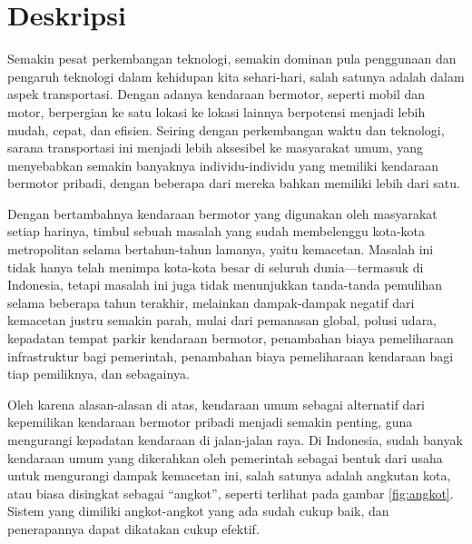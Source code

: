 \documentclass[a4paper,twoside]{article}
\begin{document}
\title{\@judultopik}
\author{\nama \textendash \@npm} 

\newcommand{\nama}{Alfred Aprianto Liaunardi}
\newcommand{\@npm}{6181801014}
\newcommand{\@judultopik}{Perkakas Command Line KIRI} %
\newcommand{\jumpemb}{1} %
\newcommand{\tanggal}{14/03/2022}


\maketitle


\section{Deskripsi}
Semakin pesat perkembangan teknologi, semakin dominan pula penggunaan dan pengaruh teknologi dalam kehidupan kita sehari-hari, salah satunya adalah dalam aspek transportasi. Dengan adanya kendaraan bermotor, seperti mobil dan motor, berpergian ke satu lokasi ke lokasi lainnya berpotensi menjadi lebih mudah, cepat, dan efisien. Seiring dengan perkembangan waktu dan teknologi, sarana transportasi ini menjadi lebih aksesibel ke masyarakat umum, yang menyebabkan semakin banyaknya individu-individu yang memiliki kendaraan bermotor pribadi, dengan beberapa dari mereka bahkan memiliki lebih dari satu.

Dengan bertambahnya kendaraan bermotor yang digunakan oleh masyarakat setiap harinya, timbul sebuah masalah yang sudah membelenggu kota-kota metropolitan selama bertahun-tahun lamanya, yaitu kemacetan. Masalah ini tidak hanya telah menimpa kota-kota besar di seluruh dunia---termasuk di Indonesia, tetapi masalah ini juga tidak menunjukkan tanda-tanda pemulihan selama beberapa tahun terakhir, melainkan dampak-dampak negatif dari kemacetan justru semakin parah, mulai dari pemanasan global, polusi udara, kepadatan tempat parkir kendaraan bermotor, penambahan biaya pemeliharaan infrastruktur bagi pemerintah, penambahan biaya pemeliharaan kendaraan bagi tiap pemiliknya, dan sebagainya.

Oleh karena alasan-alasan di atas, kendaraan umum sebagai alternatif dari kepemilikan kendaraan bermotor pribadi menjadi semakin penting, guna mengurangi kepadatan kendaraan di jalan-jalan raya. Di Indonesia, sudah banyak kendaraan umum yang dikerahkan oleh pemerintah sebagai bentuk dari usaha untuk mengurangi dampak kemacetan ini, salah satunya adalah angkutan kota, atau biasa disingkat sebagai ``angkot'', seperti terlihat pada gambar \ref{fig:angkot}. Sistem yang dimiliki angkot-angkot yang ada sudah cukup baik, dan penerapannya dapat dikatakan cukup efektif. 
\end{document}
